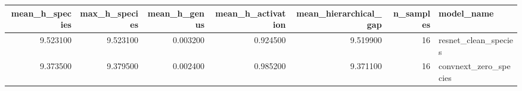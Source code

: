 \begin{tabular}{rrrrrrl}
\toprule
mean_h_species & max_h_species & mean_h_genus & mean_h_activation & mean_hierarchical_gap & n_samples & model_name \\
\midrule
9.523100 & 9.523100 & 0.003200 & 0.924500 & 9.519900 & 16 & resnet_clean_species \\
9.373500 & 9.379500 & 0.002400 & 0.985200 & 9.371100 & 16 & convnext_zero_species \\
\bottomrule
\end{tabular}
